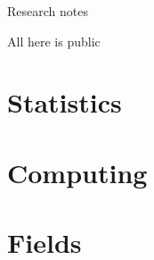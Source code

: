 \documentclass{article}
\theoremstyle{definition}
\theoremstyle{plain} %
\begin{document}
\begin{center}
	\huge{Research notes}
	
	\small{All here is public}
\end{center}

\section{Statistics}


\section{Computing}


\section{Fields}

\end{document}
